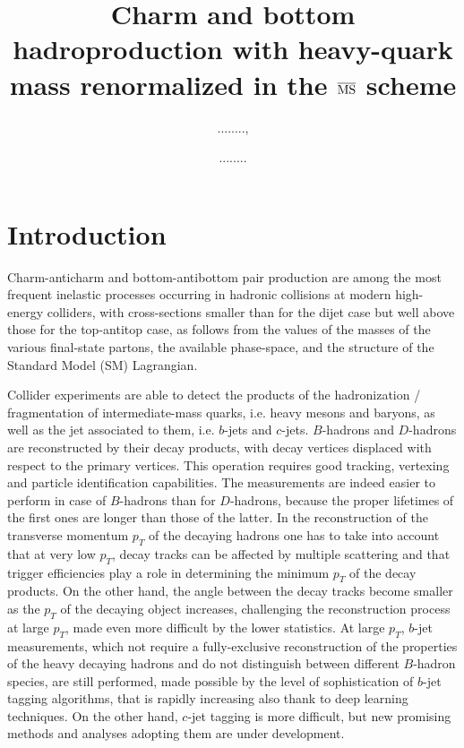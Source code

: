 \documentclass[12pt,a4paper]{article}
\title{
Charm and bottom hadroproduction with heavy-quark mass renormalized in the $\overline{\rm MS}$ scheme}
\author[a]{\!\!........,}
\author[b]{\!\!........}
\affiliation[a]{II.~Institute for Theoretical Physics, Hamburg University
\\
Luruper Chaussee 149, D--22761 Hamburg, Germany}
\affiliation[b]{....}
\begin{document}
 
\maketitle 

%
%
% 


\section{Introduction}
Charm-anticharm and bottom-antibottom pair production are among the most frequent inelastic processes occurring in hadronic collisions at modern high-energy colliders, with cross-sections smaller than for the dijet case but well above those for the top-antitop case, as follows from the values of the masses of the various final-state partons, the available phase-space, and the structure of the Standard Model (SM) Lagrangian.  

Collider experiments are able to detect the products of the hadronization / fragmentation of intermediate-mass quarks, i.e. heavy mesons and baryons, as well as the jet associated to them, i.e. $b$-jets and $c$-jets. 
$B$-hadrons and $D$-hadrons are reconstructed by their decay products, with decay vertices displaced with respect to the primary vertices. This operation requires good tracking, vertexing and particle identification capabilities. The measurements are indeed easier to perform in case of $B$-hadrons than for $D$-hadrons, because the proper lifetimes of the first ones are longer than those of the latter. 
In the reconstruction of the transverse momentum $p_T$ of the decaying hadrons one has to take into account that at very low $p_T$, decay tracks can be affected by multiple scattering and that trigger efficiencies play a role in determining the minimum $p_T$ of the decay products. On the other hand, the angle between the decay tracks become smaller as the $p_T$ of the decaying object increases, challenging the reconstruction process at large $p_T$, made even more difficult by the lower statistics. At large $p_T$, $b$-jet measurements, which not require a fully-exclusive reconstruction of the properties of the heavy decaying hadrons and do not distinguish between different $B$-hadron species, are still performed, made possible by the level of sophistication of $b$-jet tagging algorithms, that is rapidly increasing also thank to deep learning techniques. On the other hand, $c$-jet tagging is more difficult, but new promising methods and analyses adopting them are under development. 

\end{document}
